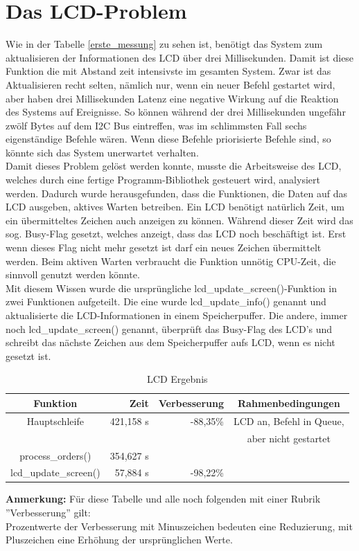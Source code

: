 \section{Das LCD-Problem\label{chapter_lcd_problem}}
Wie in der Tabelle \ref{erste_messung} zu sehen ist, benötigt das System zum aktualisieren der Informationen
des LCD über drei Millisekunden. Damit ist diese Funktion die mit Abstand zeit intensivste im gesamten System.
Zwar ist das Aktualisieren recht selten, nämlich nur, wenn ein neuer Befehl gestartet wird, aber haben drei
Millisekunden Latenz eine negative Wirkung auf die Reaktion des Systems auf Ereignisse. So können während
der drei Millisekunden ungefähr zwölf Bytes auf dem I2C Bus eintreffen, was im schlimmsten Fall sechs eigenständige
Befehle wären. Wenn diese Befehle priorisierte Befehle sind, so könnte sich das System unerwartet verhalten.\\
Damit dieses Problem gelöst werden konnte, musste die Arbeitsweise des LCD, welches durch eine fertige Programm-Bibliothek
gesteuert wird, analysiert werden. Dadurch wurde herausgefunden, dass die Funktionen, die Daten auf das LCD ausgeben,
aktives Warten betreiben. Ein LCD benötigt natürlich Zeit, um ein übermitteltes Zeichen auch anzeigen zu können.
Während dieser Zeit wird das sog. Busy-Flag gesetzt, welches anzeigt, dass das LCD noch beschäftigt ist. Erst
wenn dieses Flag nicht mehr gesetzt ist darf ein neues Zeichen übermittelt werden. Beim aktiven Warten verbraucht die
Funktion unnötig CPU-Zeit, die sinnvoll genutzt werden könnte.\\
Mit diesem Wissen wurde die ursprüngliche lcd\_\-update\_\-screen()-Funktion in zwei Funktionen aufgeteilt. Die eine
wurde lcd\_\-update\_\-info() genannt und aktualisierte die LCD-Informationen in einem Speicherpuffer. Die andere,
immer noch lcd\_\-update\_\-screen() genannt, überprüft das Busy-Flag des LCD's und schreibt das nächste Zeichen aus
dem Speicherpuffer aufs LCD, wenn es nicht gesetzt ist.
\begin{table}[htb]
\begin{center}
	\begin{tabular}{|c||r|r|c|}
		\hline
		\textbf{Funktion} & \textbf{Zeit} & \textbf{Verbesserung} & \textbf{Rahmenbedingungen} \\ \hline \hline
		Hauptschleife & 421,158 \textmu{}s & -88,35\% & LCD an, Befehl in Queue,\\
		& & & aber nicht gestartet \\ \hline
		process\_orders() & 354,627 \textmu{}s & & \\ \hline
		lcd\_update\_screen() & 57,884 \textmu{}s & -98,22\% & \\ \hline
	\end{tabular}
	\caption{\label{lcd_opt} LCD Ergebnis}
\end{center}
\textbf{Anmerkung:} Für diese Tabelle und alle noch folgenden mit einer Rubrik ''Verbesserung'' gilt:\\
Prozentwerte der Verbesserung mit Minuszeichen bedeuten eine Reduzierung, mit Pluszeichen eine Erhöhung
der ursprünglichen Werte.
\end{table}
